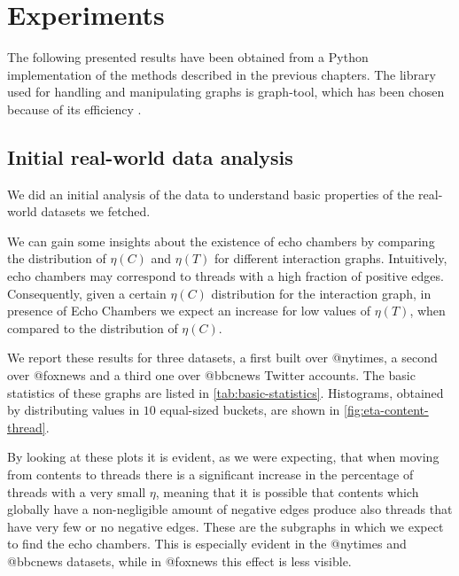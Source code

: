 \section{Experiments}

The following presented results have been obtained from a Python
implementation of the methods described in the previous chapters. The library used
for handling and manipulating graphs is graph-tool, which has been chosen
because of its efficiency \cite{peixoto_graph-tool_2014}.

\subsection{Initial real-world data analysis}%
\label{sub:validity_problem_definition}

We did an initial analysis of the data to understand basic properties of the
real-world datasets we fetched.

We can gain some insights about the existence of echo chambers by comparing
the distribution of $\eta(C)$ and $\eta(T)$ for different interaction graphs.
Intuitively, echo chambers may correspond to threads with a
high fraction of positive edges. Consequently, given a certain $\eta(C)$
distribution for the interaction graph, in presence of Echo Chambers we expect
an increase for low values of $\eta(T)$, when compared to the distribution of
$\eta(C)$.

We report these results for
three datasets, a first built over @nytimes, a second over @foxnews
and a third one over @bbcnews Twitter accounts\footnotemark. The basic
statistics of these graphs are listed in \autoref{tab:basic-statistics}. Histograms, obtained
by distributing values in $10$ equal-sized buckets, are shown in \autoref{fig:eta-content-thread}.


By looking at these plots it is evident, as we were expecting, that when
moving from
contents to threads there is a significant increase in the percentage of
threads with a very small $\eta$, meaning that it is possible that contents which
globally have
a non-negligible amount of negative edges produce also threads that have
very few or no negative edges. These are the subgraphs in which we expect to
find the echo chambers. This is especially evident in the @nytimes and @bbcnews
datasets, while in @foxnews this effect is less visible.

